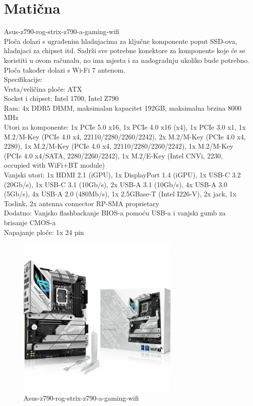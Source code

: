\documentclass{report}
\begin{document}
\chapter{Matična}
Asus-z790-rog-strix-z790-a-gaming-wifi
\\ Ploča dolazi s ugrađenim hladnjacima za ključne komponente poput SSD-ova, hladnjaci za chipset itd. Sadrži sve potrebne konektore za komponente koje će se koristiti u ovom računalu, no ima mjesta i za nadogradnju ukoliko bude potrebno. Ploča također dolazi s Wi-Fi 7 antenom.
\\Specifikacije:
\\Vrsta/veličina ploče: ATX
\\Socket i chipset: Intel 1700, Intel Z790
\\Ram: 4x DDR5 DIMM, maksimalan kapacitet 192GB, maksimalna brzina 8000 MHz
\\Utori za komponente: 1x PCIe 5.0 x16, 1x PCIe 4.0 x16 (x4), 1x PCIe 3.0 x1, 1x M.2/M-Key (PCIe 4.0 x4, 22110/2280/2260/2242), 2x M.2/M-Key (PCIe 4.0 x4, 2280), 1x M.2/M-Key (PCIe 4.0 x4, 22110/2280/2260/2242), 1x M.2/M-Key (PCIe 4.0 x4/SATA, 2280/2260/2242), 1x M.2/E-Key (Intel CNVi, 2230, occupied with WiFi+BT module)
\\Vanjski utori: 1x HDMI 2.1 (iGPU), 1x DisplayPort 1.4 (iGPU), 1x USB-C 3.2 (20Gb/s), 1x USB-C 3.1 (10Gb/s), 2x USB-A 3.1 (10Gb/s), 4x USB-A 3.0 (5Gb/s), 4x USB-A 2.0 (480Mb/s), 1x 2.5GBase-T (Intel I226-V), 2x jack, 1x Toslink, 2x antenna connector RP-SMA proprietary
\\Dodatno: Vanjsko flashbackanje BIOS-a  pomoću USB-a i vanjski gumb za brisanje CMOS-a
\\Napajanje ploče: 1x 24 pin
\begin{figure}[h]
\includegraphics[width=8cm]{Matična.jpg}
\caption{Asus-z790-rog-strix-z790-a-gaming-wifi}
\end{figure}
\end{document}
